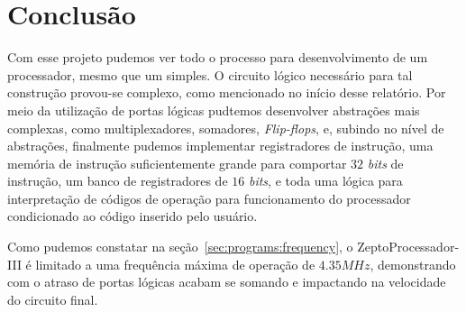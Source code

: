 \documentclass[12pt]{article}
\begin{document}










\section{Conclusão}\label{sec:Conclusao}

Com esse projeto pudemos ver todo o processo para desenvolvimento de um
processador, mesmo que um simples. O circuito lógico necessário para tal
construção provou-se complexo, como mencionado no início desse relatório. Por
meio da utilização de portas lógicas pudtemos desenvolver abstrações mais
complexas, como multiplexadores, somadores, \emph{Flip-flops}, e, subindo no
nível de abstrações, finalmente pudemos implementar registradores de instrução,
uma memória de instrução suficientemente grande para comportar $32$ \emph{bits}
de instrução, um banco de registradores de $16$ \emph{bits}, e toda uma lógica
para interpretação de códigos de operação para funcionamento do processador
condicionado ao código inserido pelo usuário.

Como pudemos constatar na seção~\ref{sec:programs:frequency}, o
ZeptoProcessador-III é limitado a uma frequência máxima de operação de
$4.35MHz$, demonstrando com o atraso de portas lógicas acabam se somando e
impactando na velocidade do circuito final.


\end{document}
